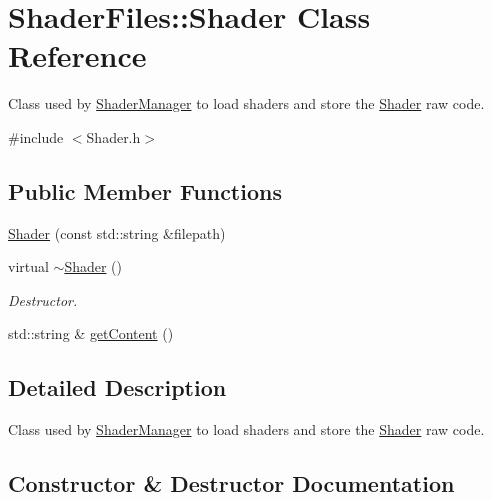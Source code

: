 \hypertarget{class_shader_files_1_1_shader}{}\section{Shader\+Files\+::Shader Class Reference}
\label{class_shader_files_1_1_shader}


Class used by \mbox{\hyperlink{class_shader_files_1_1_shader_manager}{Shader\+Manager}} to load shaders and store the \mbox{\hyperlink{class_shader_files_1_1_shader}{Shader}} raw code.  




{\ttfamily \#include $<$Shader.\+h$>$}

\subsection*{Public Member Functions}
\begin{DoxyCompactItemize}
\item 
\mbox{\hyperlink{class_shader_files_1_1_shader_ae4e5376d2370a4f07240516ac2582f2b}{Shader}} (const std\+::string \&filepath)
\item 
\mbox{\label{class_shader_files_1_1_shader_a3f173cc6b2eabab2e7d89bb7000a42e1}} 
virtual \mbox{\hyperlink{class_shader_files_1_1_shader_a3f173cc6b2eabab2e7d89bb7000a42e1}{$\sim$\+Shader}} ()
\begin{DoxyCompactList}\small\item\em Destructor. \end{DoxyCompactList}\item 
std\+::string \& \mbox{\hyperlink{class_shader_files_1_1_shader_aa62cf96b80a461f38e81313699434279}{get\+Content}} ()
\end{DoxyCompactItemize}


\subsection{Detailed Description}
Class used by \mbox{\hyperlink{class_shader_files_1_1_shader_manager}{Shader\+Manager}} to load shaders and store the \mbox{\hyperlink{class_shader_files_1_1_shader}{Shader}} raw code. 

\subsection{Constructor \& Destructor Documentation}
\mbox{\label{class_shader_files_1_1_shader_ae4e5376d2370a4f07240516ac2582f2b}} 
